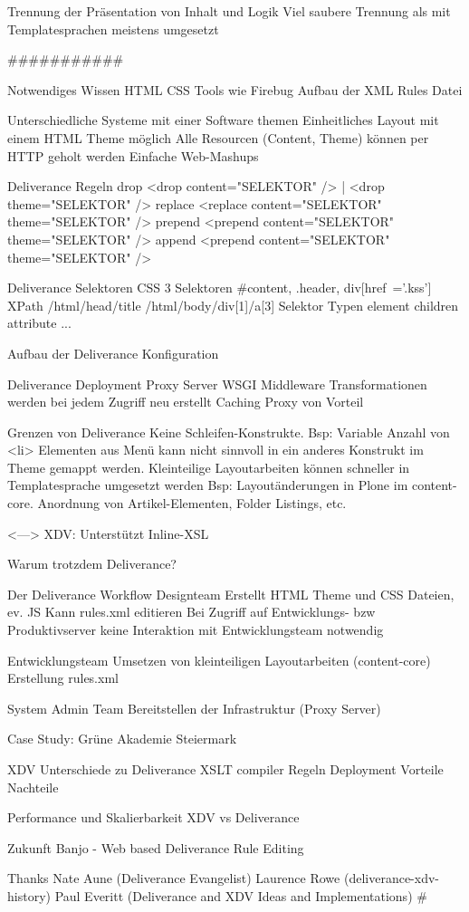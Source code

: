     Trennung der Präsentation von Inhalt und Logik
        Viel saubere Trennung als mit Templatesprachen meistens umgesetzt

###########

    Notwendiges Wissen
        HTML
        CSS
        Tools wie Firebug
        Aufbau der XML Rules Datei

    Unterschiedliche Systeme mit einer Software themen
        Einheitliches Layout mit einem HTML Theme möglich
        Alle Resourcen (Content, Theme) können per HTTP geholt werden
        Einfache Web-Mashups

Deliverance Regeln
    drop
        <drop content="SELEKTOR" /> | <drop theme="SELEKTOR" />
    replace
        <replace content="SELEKTOR" theme="SELEKTOR" />
    prepend
        <prepend content="SELEKTOR" theme="SELEKTOR" />
    append
        <prepend content="SELEKTOR" theme="SELEKTOR" />

Deliverance Selektoren
    CSS 3 Selektoren
        #content, .header, div[href~='.kss']
    XPath
        /html/head/title
        /html/body/div[1]/a[3]
    Selektor Typen
        element
        children
        attribute
        ...


Aufbau der Deliverance Konfiguration


Deliverance Deployment
    Proxy Server
    WSGI Middleware
    Transformationen werden bei jedem Zugriff neu erstellt
    Caching Proxy von Vorteil


Grenzen von Deliverance
    Keine Schleifen-Konstrukte.
        Bsp: Variable Anzahl von <li> Elementen aus Menü kann nicht sinnvoll in ein anderes Konstrukt im Theme gemappt werden.
    Kleinteilige Layoutarbeiten können schneller in Templatesprache umgesetzt werden
        Bsp: Layoutänderungen in Plone im content-core. Anordnung von Artikel-Elementen, Folder Listings, etc.

    <---> XDV: Unterstützt Inline-XSL

Warum trotzdem Deliverance?

Der Deliverance Workflow
    Designteam
        Erstellt HTML Theme und CSS Dateien, ev. JS
        Kann rules.xml editieren
        Bei Zugriff auf Entwicklungs- bzw Produktivserver keine Interaktion mit Entwicklungsteam notwendig

    Entwicklungsteam
        Umsetzen von kleinteiligen Layoutarbeiten (content-core)
        Erstellung rules.xml

    System Admin Team
        Bereitstellen der Infrastruktur (Proxy Server)


Case Study: Grüne Akademie Steiermark


XDV
    Unterschiede zu Deliverance
        XSLT compiler
        Regeln
        Deployment
        Vorteile
        Nachteile

Performance und Skalierbarkeit
    XDV vs Deliverance

Zukunft
    Banjo - Web based Deliverance Rule Editing


Thanks
    Nate Aune (Deliverance Evangelist)
    Laurence Rowe (deliverance-xdv-history)
    Paul Everitt (Deliverance and XDV Ideas and Implementations)
#
